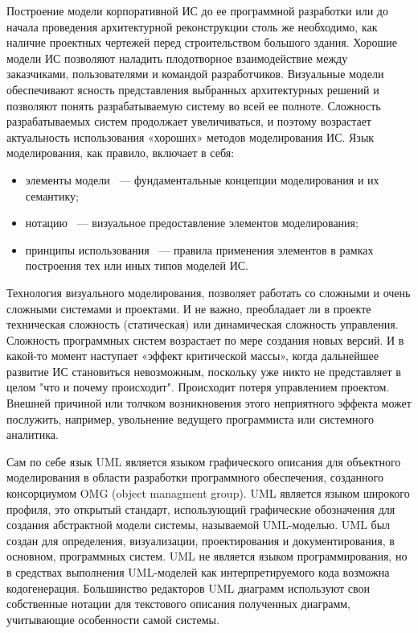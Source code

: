 Построение модели корпоративной ИС до ее программной разработки или до начала проведения архитектурной реконструкции столь же необходимо, как наличие проектных чертежей перед строительством большого здания. Хорошие модели ИС позволяют наладить плодотворное взаимодействие между заказчиками, пользователями и командой разработчиков. Визуальные модели обеспечивают ясность представления выбранных архитектурных решений и позволяют понять разрабатываемую систему во всей ее полноте. Сложность разрабатываемых систем продолжает увеличиваться, и поэтому возрастает актуальность использования «хороших» методов моделирования ИС. Язык моделирования, как правило, включает в себя:
\begin{itemize}
\item элементы модели ~--- фундаментальные концепции моделирования и их семантику;
\item нотацию ~--- визуальное предоставление элементов моделирования;
\item принципы использования ~--- правила применения элементов в рамках построения тех или иных типов моделей ИС.
\end{itemize}

Технология визуального моделирования, позволяет работать со сложными и очень сложными системами и проектами. И не важно, преобладает ли в проекте техническая сложность (статическая) или динамическая сложность управления. Сложность программных систем возрастает по мере создания новых версий. И в какой-то момент наступает «эффект критической массы», когда дальнейшее развитие ИС становиться невозможным, поскольку уже никто не представляет в целом "что и почему происходит". Происходит потеря управлением проектом. Внешней причиной или толчком возникновения этого неприятного эффекта может послужить, например, увольнение ведущего программиста или системного аналитика.

Сам по себе язык UML является языком графического описания для объектного моделирования в области разработки программного обеспечения, созданного консорциумом OMG (object managment group). UML является языком широкого профиля, это открытый стандарт, использующий графические обозначения для создания абстрактной модели системы, называемой UML-моделью. UML был создан для определения, визуализации, проектирования и документирования, в основном, программных систем. UML не является языком программирования, но в средствах выполнения UML-моделей как интерпретируемого кода возможна кодогенерация. Большинство редакторов UML диаграмм используют свои собственные нотации для текстового описания полученных диаграмм, учитывающие особенности самой системы.


